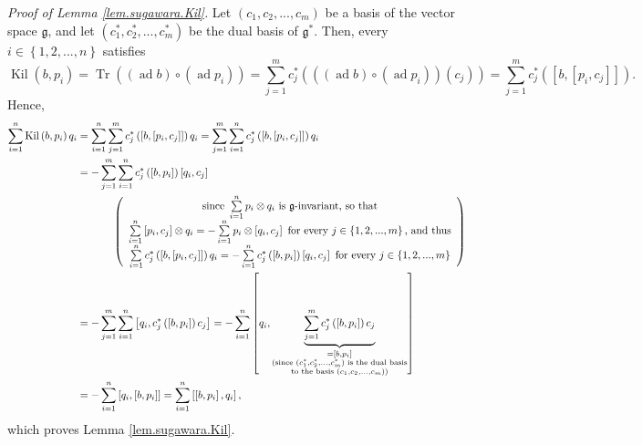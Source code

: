 \documentclass[etingof-lie.tex]{subfiles}
\begin{document}
\textit{Proof of Lemma \ref{lem.sugawara.Kil}.} Let $\left(  c_{1}%
,c_{2},...,c_{m}\right)  $ be a basis of the vector space $\mathfrak{g}$, and
let $\left(  c_{1}^{\ast},c_{2}^{\ast},...,c_{m}^{\ast}\right)  $ be the dual
basis of $\mathfrak{g}^{\ast}$. Then, every $i\in\left\{  1,2,...,n\right\}  $
satisfies
\[
\operatorname*{Kil}\left(  b,p_{i}\right)  =\operatorname*{Tr}\left(  \left(
\operatorname*{ad}b\right)  \circ\left(  \operatorname*{ad}p_{i}\right)
\right)  =\sum\limits_{j=1}^{m}c_{j}^{\ast}\left(  \left(  \left(
\operatorname*{ad}b\right)  \circ\left(  \operatorname*{ad}p_{i}\right)
\right)  \left(  c_{j}\right)  \right)  =\sum\limits_{j=1}^{m}c_{j}^{\ast
}\left(  \left[  b,\left[  p_{i},c_{j}\right]  \right]  \right)  .
\]
Hence,%
\begin{align*}
\sum\limits_{i=1}^{n}\operatorname*{Kil}\left(  b,p_{i}\right)  q_{i}  &
=\sum\limits_{i=1}^{n}\sum\limits_{j=1}^{m}c_{j}^{\ast}\left(  \left[
b,\left[  p_{i},c_{j}\right]  \right]  \right)  q_{i}=\sum\limits_{j=1}%
^{m}\sum\limits_{i=1}^{n}c_{j}^{\ast}\left(  \left[  b,\left[  p_{i}%
,c_{j}\right]  \right]  \right)  q_{i}\\
&  =-\sum\limits_{j=1}^{m}\sum\limits_{i=1}^{n}c_{j}^{\ast}\left(  \left[
b,p_{i}\right]  \right)  \left[  q_{i},c_{j}\right] \\
&  \ \ \ \ \ \ \ \ \ \ \left(
\begin{array}
[c]{c}%
\text{since }\sum\limits_{i=1}^{n}p_{i}\otimes q_{i}\text{ is } \mathfrak{g}%
\text{-invariant, so that}\\
\sum\limits_{i=1}^{n}\left[  p_{i},c_{j}\right]  \otimes q_{i}=-\sum
\limits_{i=1}^{n}p_{i}\otimes\left[  q_{i},c_{j}\right]  \text{ for every
}j\in\left\{  1,2,...,m\right\}  \text{, and thus}\\
\sum\limits_{i=1}^{n}c_{j}^{\ast}\left(  \left[  b,\left[  p_{i},c_{j}\right]
\right]  \right)  q_{i}=-\sum\limits_{i=1}^{n}c_{j}^{\ast}\left(  \left[
b,p_{i}\right]  \right)  \left[  q_{i},c_{j}\right]  \text{ for every }%
j\in\left\{  1,2,...,m\right\}
\end{array}
\right) \\
&  =-\sum\limits_{j=1}^{m}\sum\limits_{i=1}^{n}\left[  q_{i},c_{j}^{\ast
}\left(  \left[  b,p_{i}\right]  \right)  c_{j}\right]  =-\sum\limits_{i=1}%
^{n}\left[  q_{i},\underbrace{\sum\limits_{j=1}^{m}c_{j}^{\ast}\left(  \left[
b,p_{i}\right]  \right)  c_{j}}_{\substack{=\left[  b,p_{i}\right]
\\\text{(since }\left(  c_{1}^{\ast},c_{2}^{\ast},...,c_{m}^{\ast}\right)
\text{ is the dual basis}\\\text{to the basis }\left(  c_{1},c_{2}%
,...,c_{m}\right)  \text{)}}}\right] \\
&  =-\sum\limits_{i=1}^{n}\left[  q_{i},\left[  b,p_{i}\right]  \right]
=\sum\limits_{i=1}^{n}\left[  \left[  b,p_{i}\right]  ,q_{i}\right]  ,
\end{align*}
which proves Lemma \ref{lem.sugawara.Kil}.
\end{document}
